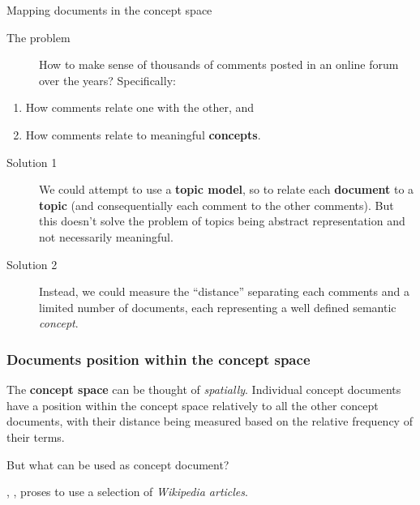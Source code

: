 \documentclass[serif, aspectratio=169]{beamer}
\newcommand{\customcite}[1]{\citeauthor{#1}, \citetitle{#1}, \citeyear{#1}}
\begin{document}
\begin{frame}
{Mapping documents in the concept space}

\begin{description}

\item [The problem] How to make sense of thousands of comments posted in an online forum over the years? Specifically:

\end{description}

\begin{enumerate}

\item How comments relate one with the other, and
\item How comments relate to meaningful \textbf{concepts}.

\end{enumerate}

\begin{description}

\item[Solution 1] We could attempt to use a \textbf{topic model}, so to relate each \textbf{document} to a \textbf{topic} (and consequentially each comment to the other comments). But this doesn't solve the problem of topics being abstract representation and not necessarily meaningful. 

\item[Solution 2] Instead, we could measure the ``distance'' separating each comments and a limited number of documents, each representing a well defined semantic \textit{concept}.

\end{description}

\end{frame}

\begin{frame}
\frametitle{Documents position within the concept space}

\nocite{gabrilovich_computing_2007}

The \textbf{concept space} can be thought of \textit{spatially}. Individual concept documents have a position within the concept space relatively to all the other concept documents, with their distance being measured based on the relative frequency of their terms. 

But what can be used as concept document?

\customcite{gabrilovich_computing_2007} proses to use a selection of \textit{Wikipedia articles}. 

\end{frame}
\end{document}
